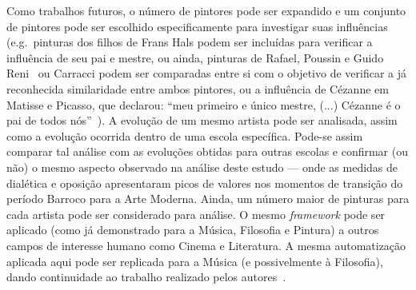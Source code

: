Como trabalhos futuros, o número de pintores pode ser expandido e um
conjunto de pintores pode ser escolhido especificamente para
investigar suas influências (e.g.\ pinturas dos filhos de Frans Hals
podem ser incluídas para verificar a influência de seu pai e mestre,
ou ainda, pinturas de Rafael, Poussin e Guido Reni~\cite{gombrich} ou
Carracci podem ser comparadas entre si com o objetivo de verificar a
já reconhecida similaridade entre ambos pintores, ou a influência de
Cézanne em Matisse e Picasso, que declarou: ``meu primeiro e único
mestre, (...)  Cézanne é o pai de todos nós''~\cite{rishel}). A
evolução de um mesmo artista pode ser analisada, assim como a evolução
ocorrida dentro de uma escola específica. Pode-se assim comparar tal
análise com as evoluções obtidas para outras escolas e confirmar (ou
não) o mesmo aspecto observado na análise deste estudo --- onde as
medidas de dialética e oposição apresentaram picos de valores nos
momentos de transição do período Barroco para a Arte Moderna. Ainda,
um número maior de pinturas para cada artista pode ser considerado
para análise. O mesmo \textit{framework} pode ser aplicado (como já
demonstrado para a Música, Filosofia e Pintura) a outros campos de
interesse humano como Cinema e Literatura. A mesma automatização
aplicada aqui pode ser replicada para a Música (e possivelmente à
Filosofia), dando continuidade ao trabalho realizado pelos
autores~\cite{vieira}.



